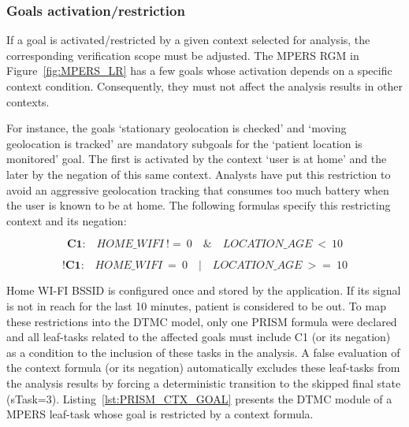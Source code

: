 

\subsubsection{Goals activation/restriction}

If a goal is activated/restricted by a given context selected for analysis, the corresponding verification scope must be adjusted. The MPERS RGM in Figure~\ref{fig:MPERS_LR} has a few goals whose activation depends on a specific context condition. Consequently, they must not affect the analysis results in other contexts.

For instance, the goals `stationary geolocation is checked' and `moving geolocation is tracked' are mandatory subgoals for the `patient location is monitored' goal. The first is activated by the context `user is at home' and the later by the negation of this same context. Analysts have put this restriction to avoid an aggressive geolocation tracking that consumes too much battery when the user is known to be at home. The following formulas specify this restricting context and its negation:

\begin{equation}\label{eq:C1a}
\textbf{C1:}\quad HOME\_WIFI\ !=\ 0\quad \&\quad LOCATION\_AGE\ <\ 10
\end{equation}

\begin{equation}\label{eq:C1b}
\textbf{!C1:}\quad HOME\_WIFI\ =\ 0\quad |\quad LOCATION\_AGE\ >=\ 10
\end{equation}

Home WI-FI BSSID is configured once and stored by the application. If its signal is not in reach for the last 10 minutes, patient is considered to be out. To map these restrictions into the DTMC model, only one PRISM formula were declared and all leaf-tasks related to the affected goals must include C1 (or its negation) as a condition to the inclusion of these tasks in the analysis. A false evaluation of the context formula (or its negation) automatically excludes these leaf-tasks from the analysis results by forcing a deterministic transition to the skipped final state (sTask=3). Listing~\ref{lst:PRISM_CTX_GOAL} presents the DTMC module of a MPERS leaf-task whose goal is restricted by a context formula.
\medskip

